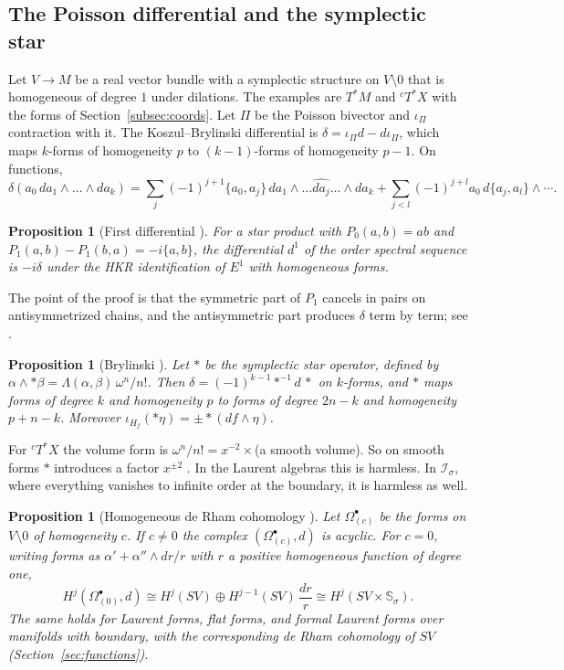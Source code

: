 \documentclass[11pt,oneside,reqno]{article}
\newcommand{\Is}{\mathcal I_\sigma}
\newcommand{\cT}{{}^cT^*X}
\newcommand{\Ssig}{\mathbb S_\sigma}
\theoremstyle{plain}
\newtheorem{proposition}[theorem]{Proposition}
\theoremstyle{definition}
\theoremstyle{remark}
\begin{document}
\subsection{The Poisson differential and the symplectic star}
\label{subsec:poissonstar}
Let \(V\to M\) be a real vector bundle with a symplectic structure on
\(V\setminus0\) that is homogeneous of degree \(1\) under dilations. The
examples are \(T^*M\) and \(\cT\) with the forms of
Section~\ref{subsec:coords}. Let \(\Pi\) be the Poisson bivector and
\(\iota_\Pi\) contraction with it. The Koszul--Brylinski differential is
\(\delta=\iota_\Pi d-d\iota_\Pi\), which maps \(k\)-forms of homogeneity
\(p\) to \((k-1)\)-forms of homogeneity \(p-1\). On functions,
\[
 \delta(a_0\,da_1\wedge\dots\wedge da_k)=\sum_j(-1)^{j+1}\{a_0,a_j\}\,
 da_1\wedge\dots\widehat{da_j}\dots\wedge da_k+\sum_{j<l}(-1)^{j+l}a_0\,
 d\{a_j,a_l\}\wedge\cdots .
\]

\begin{proposition}[First differential {\cite[Prop.~``d1'']{MelroseMicro}}]
\label{prop:d1}
For a star product with \(P_0(a,b)=ab\) and \(P_1(a,b)-P_1(b,a)=-i\{a,b\}\),
the differential \(d^1\) of the order spectral sequence is \(-i\delta\)
under the HKR identification of \(E^1\) with homogeneous forms.
\end{proposition}

The point of the proof is that the symmetric part of \(P_1\) cancels in
pairs on antisymmetrized chains, and the antisymmetric part produces
\(\delta\) term by term; see \cite[Ch.~10]{MelroseMicro}.

\begin{proposition}[Brylinski \cite{Brylinski}]\label{prop:star}
Let \(*\) be the symplectic star operator, defined by
\(\alpha\wedge*\beta=\Lambda(\alpha,\beta)\,\omega^n/n!\). Then
\(\delta=(-1)^{k-1}*^{-1}d\,*\) on \(k\)-forms, and \(*\) maps forms of
degree \(k\) and homogeneity \(p\) to forms of degree \(2n-k\) and
homogeneity \(p+n-k\). Moreover
\(\iota_{H_f}(*\eta)=\pm*(df\wedge\eta)\).
\end{proposition}

For \(\cT\) the volume form is \(\omega^n/n!=x^{-2}\times\)(a smooth
volume). So on smooth forms \(*\) introduces a factor \(x^{\pm2}\)
\cite[p.~12]{MN}. In the Laurent algebras this is harmless. In \(\Is\),
where everything vanishes to infinite order at the boundary, it is
harmless as well.

\begin{proposition}[Homogeneous de Rham cohomology {\cite[Lemma~3]{MN}}]
\label{prop:homog}
Let \(\Omega^\bullet_{(c)}\) be the forms on \(V\setminus0\) of homogeneity
\(c\). If \(c\ne0\) the complex \((\Omega^\bullet_{(c)},d)\) is acyclic. For
\(c=0\), writing forms as \(\alpha'+\alpha''\wedge dr/r\) with \(r\) a
positive homogeneous function of degree one,
\[
 H^j(\Omega^\bullet_{(0)},d)\cong H^j(SV)\oplus H^{j-1}(SV)\,\frac{dr}r
 \cong H^j(SV\times\Ssig).
\]
The same holds for Laurent forms, flat forms, and formal Laurent forms
over manifolds with boundary, with the corresponding de Rham cohomology of
\(SV\) (Section~\ref{sec:functions}).
\end{proposition}
\end{document}
